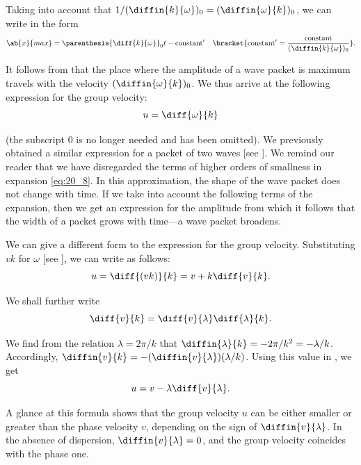 Taking into account that $1/(\diffin{k}{\omega})_0 = (\diffin{\omega}{k})_0$, we can write  in the form
\begin{equation}\label{eq:20_14}
	\ab{x}{max} = \parenthesis{\diff{k}{\omega}}_0 t - \text{constant}' \quad \bracket{\text{constant}'=\frac{\text{constant}}{(\diffin{k}{\omega})_0}}.
\end{equation}

It follows from  that the place where the amplitude of a wave packet is maximum travels with the velocity $(\diffin{\omega}{k})_0$.
We thus arrive at the following expression for the group velocity:
\begin{equation}\label{eq:20_15}
	u = \diff{\omega}{k}
\end{equation}

\noindent
(the subscript $0$ is no longer needed and has been omitted).
We previously obtained a similar expression for a packet of two waves [see ].
We remind our reader that we have disregarded the terms of higher orders of smallness in expansion \eqref{eq:20_8}.
In this approximation, the shape of the wave packet does not change with time.
If we take into account the following terms of the expansion, then we get an expression for the amplitude from which it follows that the width of a packet grows with time---a wave packet broadens.

We can give a different form to the expression for the group velocity.
Substituting $vk$ for $\omega$ [see ], we can write  as follows:
\begin{equation}\label{eq:20_16}
	u = \diff{(vk)}{k} = v + k \diff{v}{k}.
\end{equation}

\noindent
We shall further write
\begin{equation*}
	\diff{v}{k} = \diff{v}{\lambda} \diff{\lambda}{k}.
\end{equation*}

We find from the relation $\lambda = 2\pi/k$ that $\diffin{\lambda}{k}=-2\pi/k^2=-\lambda/k$.
Accordingly, $\diffin{v}{k}=-(\diffin{v}{\lambda}) (\lambda/k)$.
Using this value in , we get
\begin{equation}\label{eq:20_17}
	u = v - \lambda \diff{v}{\lambda}.
\end{equation}

\noindent
A glance at this formula shows that the group velocity $u$ can be either smaller or greater than the phase velocity $v$, depending on the sign of $\diffin{v}{\lambda}$.
In the absence of dispersion, $\diffin{v}{\lambda} = 0$, and the group velocity coincides with the phase one.


